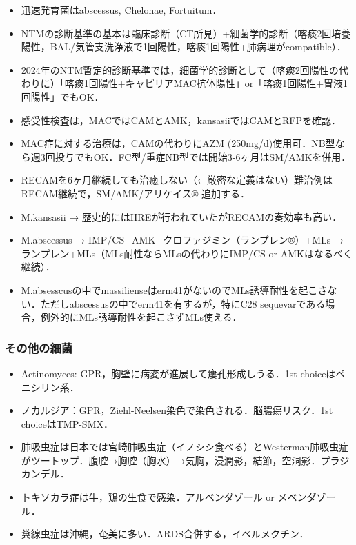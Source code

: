 \begin{itemize}
\item 迅速発育菌はabscessus, Chelonae, Fortuitum．
\item NTMの診断基準の基本は臨床診断（CT所見）+細菌学的診断（喀痰2回培養陽性，BAL/気管支洗浄液で1回陽性，喀痰1回陽性+肺病理がcompatible）．
\item 2024年のNTM暫定的診断基準では，細菌学的診断として（喀痰2回陽性の代わりに）「喀痰1回陽性+キャピリアMAC抗体陽性」or「喀痰1回陽性+胃液1回陽性」でもOK．
\item 感受性検査は，MACではCAMとAMK，kansasiiではCAMとRFPを確認．
\item MAC症に対する治療は，CAMの代わりにAZM (250mg/d)使用可．NB型なら週3回投与でもOK．FC型/重症NB型では開始3-6ヶ月はSM/AMKを併用．
\item RECAMを6ヶ月継続しても治癒しない（←厳密な定義はない）難治例はRECAM継続で，SM/AMK/アリケイス® 追加する．
\item M.kansasii → 歴史的にはHREが行われていたがRECAMの奏効率も高い．
\item M.abscessus → IMP/CS+AMK+クロファジミン（ランプレン®）+MLs → ランプレン+MLs（MLs耐性ならMLsの代わりにIMP/CS or AMKはなるべく継続）．
\item M.absesscusの中でmassilienseはerm41がないのでMLs誘導耐性を起こさない．ただしabscessusの中でerm41を有するが，特にC28 sequevarである場合，例外的にMLs誘導耐性を起こさずMLs使える．
\end{itemize}


\subsubsection{その他の細菌}

\begin{itemize}
\item Actinomyces: GPR，胸壁に病変が進展して瘻孔形成しうる．1st choiceはペニシリン系．
\item ノカルジア：GPR，Ziehl-Neelsen染色で染色される．脳膿瘍リスク．1st choiceはTMP-SMX．
\item 肺吸虫症は日本では宮崎肺吸虫症（イノシシ食べる）とWesterman肺吸虫症がツートップ．腹腔→胸腔（胸水）→気胸，浸潤影，結節，空洞影．プラジカンデル．
\item トキソカラ症は牛，鶏の生食で感染．アルベンダゾール or メベンダゾール．
\item 糞線虫症は沖縄，奄美に多い．ARDS合併する，イベルメクチン．
\end{itemize}



